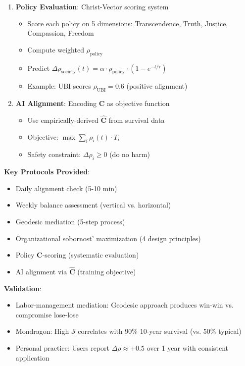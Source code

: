 \documentclass[11pt,a4paper]{article}
\theoremstyle{definition}
\theoremstyle{remark}
\begin{document}
\begin{enumerate}
\begin{mdframed}[backgroundcolor=green!10,linewidth=2pt,linecolor=green!70!black]
\begin{enumerate}[nosep]
    \item \textbf{Policy Evaluation}: Christ-Vector scoring system
        \begin{itemize}[nosep]
            \item Score each policy on 5 dimensions: Transcendence, Truth, Justice, Compassion, Freedom
            \item Compute weighted \(\rho_{\text{policy}}\)
            \item Predict \(\Delta\rho_{\text{society}}(t) = \alpha \cdot \rho_{\text{policy}} \cdot (1-e^{-t/\tau})\)
            \item Example: UBI scores \(\rho_{\text{UBI}} = 0.6\) (positive alignment)
        \end{itemize}
    
    \item \textbf{AI Alignment}: Encoding \(\mathbf{C}\) as objective function
        \begin{itemize}[nosep]
            \item Use empirically-derived \(\hat{\mathbf{C}}\) from survival data
            \item Objective: \(\max \sum_i \rho_i(t) \cdot T_i\)
            \item Safety constraint: \(\Delta\rho_i \geq 0\) (do no harm)
        \end{itemize}
\end{enumerate}

\textbf{Key Protocols Provided}:
\begin{itemize}[nosep]
    \item Daily alignment check (5-10 min)
    \item Weekly balance assessment (vertical vs. horizontal)
    \item Geodesic mediation (5-step process)
    \item Organizational sobornost' maximization (4 design principles)
    \item Policy \(\mathbf{C}\)-scoring (systematic evaluation)
    \item AI alignment via \(\hat{\mathbf{C}}\) (training objective)
\end{itemize}

\textbf{Validation}:
\begin{itemize}[nosep]
    \item Labor-management mediation: Geodesic approach produces win-win vs. compromise lose-lose
    \item Mondragon: High \(\mathcal{S}\) correlates with 90\% 10-year survival (vs. 50\% typical)
    \item Personal practice: Users report \(\Delta\rho \approx +0.5\) over 1 year with consistent application
\end{itemize}


\end{mdframed}
\end{enumerate}
\end{document}
